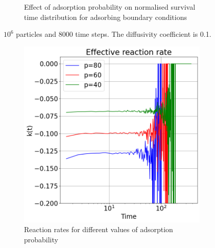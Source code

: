 \documentclass{article}
\begin{document}
\begin{figure}[htbp]
\begin{subfigure}[b]{0.45\textwidth}
        \caption{Effect of adsorption probability on normalised survival time distribution for adsorbing boundary conditions}
    \end{subfigure}
    \caption{$10^6$ particles and 8000 time steps. The diffusivity coefficient is 0.1.}
    \label{fig:survTimeAdsProb}
\end{figure}

\begin{figure}[htbp]
    \centering
    \begin{subfigure}[b]{0.45\textwidth}
        \centering
        \includegraphics[width=\textwidth]{images/compareAdsRatesProb.png}
        \caption{Reaction rates for different values of adsorption probability}
    \end{subfigure}
    \hfill
    \begin{subfigure}[b]{0.45\textwidth}
        \centering

\end{subfigure}
\end{figure}
\end{document}
